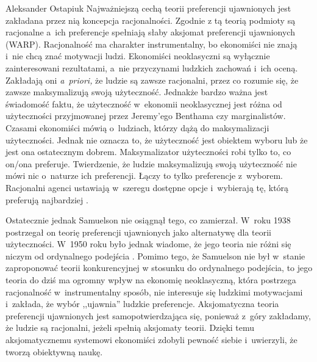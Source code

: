 \begin{artplenv}{Aleksander Ostapiuk}
Najważniejszą cechą teorii preferencji ujawnionych jest zakładana przez nią koncepcja racjonalności.
Zgodnie z tą teorią podmioty są racjonalne a~ich preferencje spełniają słaby aksjomat preferencji ujawnionych (WARP).
Racjonalność ma charakter instrumentalny, bo ekonomiści nie znają i~nie chcą znać motywacji ludzi. Ekonomiści
neoklasyczni są wyłącznie zainteresowani rezultatami, a~nie przyczynami ludzkich zachowań i~ich oceną. Zakładają oni
\textit{a~priori,} że ludzie są zawsze racjonalni, przez co rozumie się, że zawsze maksymalizują swoją użyteczność. Jednakże
bardzo ważna jest świadomość faktu, że użyteczność w~ekonomii neoklasycznej jest różna od użyteczności przyjmowanej
przez Jeremy'ego Benthama czy marginalistów. Czasami ekonomiści mówią o~ludziach, którzy dążą do maksymalizacji użyteczności.
Jednak nie oznacza to, że użyteczność jest obiektem wyboru lub że jest ona ostatecznym dobrem. Maksymalizator
użyteczności robi tylko to, co on/ona preferuje. Twierdzenie, że ludzie maksymalizują swoją użyteczność nie mówi
nic o~naturze ich preferencji. Łączy to tylko preferencje z~wyborem. Racjonalni agenci ustawiają w~szeregu dostępne
opcje i~wybierają tę, którą preferują najbardziej
\parencite[s.~18]{hausman_inexact_1992}.

Ostatecznie jednak Samuelson nie osiągnął tego, co zamierzał. W~roku 1938 postrzegał on teorię preferencji ujawnionych
jako alternatywę dla teorii użyteczności. W~1950 roku było jednak wiadome, że jego teoria nie różni się niczym od
ordynalnego podejścia
\parencite{wong_foundations_2006}.
Pomimo tego, że Samuelson nie był w~stanie
zaproponować teorii konkurencyjnej w stosunku do ordynalnego podejścia, to jego teoria do dziś ma ogromny wpływ na ekonomię
neoklasyczną, która postrzega racjonalność w~instrumentalny sposób, nie interesuje się ludzkimi motywacjami i~zakłada,
że wybór ,,ujawnia'' ludzkie preferencje. Aksjomatyczna teoria preferencji ujawnionych jest samopotwierdzająca się, ponieważ
z~góry zakładamy, że ludzie są racjonalni, jeżeli spełnią aksjomaty teorii. Dzięki temu aksjomatycznemu
systemowi ekonomiści zdobyli pewność siebie i~uwierzyli, że tworzą obiektywną naukę. 


\end{artplenv}
